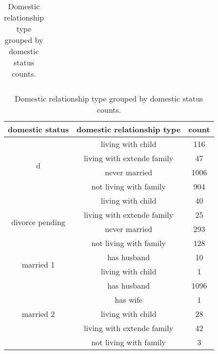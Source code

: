 \begin{table}[!h]
\begin{minipage}{.3\textwidth}
\begin{tabular}{cc}
    \end{tabular}
\end{minipage}
\begin{minipage}{.7\textwidth}
    \caption{Domestic relationship type grouped by domestic status counts.}
    \label{tab:domestic_type_by_status_counts}
    \centering
    \begin{tabular}{ccc}
        domestic status      & domestic relationship type & count  \\
        \hline
        \multirow{4}{*}{d}   & living with child          &    116 \\
        & living with extende family &     47 \\
        & never married              &   1006 \\
        & not living with family     &    904 \\
        \multirow{4}{*}{divorce pending} & living with child          &     40 \\
        & living with extende family &     25 \\
        & never married              &    293 \\
        & not living with family     &    128 \\
        \multirow{2}{*}{married 1} & has husband                &     10 \\
        & living with child          &      1 \\
        \multirow{5}{*}{married 2} & has husband                &   1096 \\
        & has wife                   &      1 \\
        & living with child          &     28 \\
        & living with extende family &     42 \\
        & not living with family     &      3 \\

\end{tabular}
\end{minipage}
\end{table}
